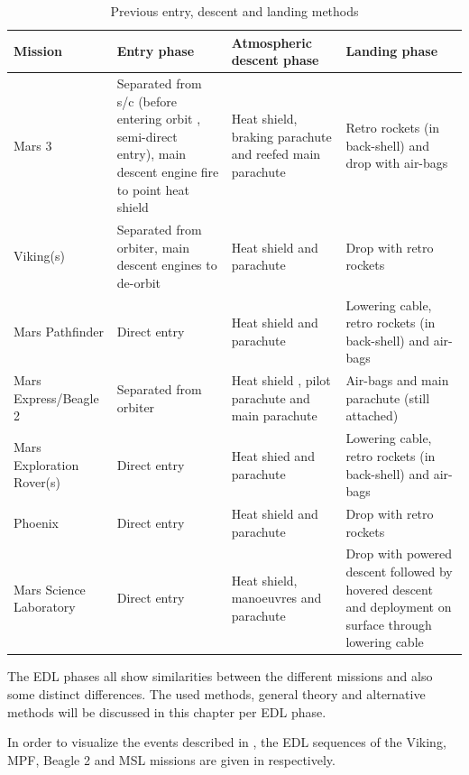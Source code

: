 \begin{longtable}{|l|p{4cm}|p{4cm}|p{4cm}|}
\caption{Previous entry, descent and landing methods}
\label{tab:overtechentdes}
\endfirsthead
\endhead
\hline 
\textbf{Mission} 		& \textbf{Entry phase} & \textbf{Atmospheric descent phase} & \textbf{Landing phase} \\ \hline \hline
Mars 3 		& Separated from \ac{s/c} (before entering orbit \cite{mars3_2014}, semi-direct entry), main descent engine fire to point heat shield & Heat shield, braking parachute and reefed main parachute \cite{macdonald2014} & Retro rockets (in back-shell) and drop with air-bags \cite{perminov1999} \\ \hline
Viking(s) 		& Separated from orbiter, main descent engines to de-orbit & Heat shield and parachute & Drop with retro rockets \\ \hline
Mars Pathfinder 		& Direct entry & Heat shield and parachute & Lowering cable, retro rockets (in back-shell) and air-bags  \\ \hline
Mars Express/Beagle 2 		& Separated from orbiter & Heat shield , pilot parachute and main parachute \cite{mooij2013para} & Air-bags and main parachute (still attached) \\ \hline
Mars Exploration Rover(s) 		& Direct entry & Heat shied and parachute & Lowering cable, retro rockets (in back-shell) and air-bags \\ \hline
Phoenix 		& Direct entry & Heat shield and parachute & Drop with retro rockets \\ \hline
Mars Science Laboratory 		& Direct entry & Heat shield, manoeuvres and parachute & Drop with powered descent followed by hovered descent and deployment on surface through lowering cable \\ \hline
	
\end{longtable}

The \ac{EDL} phases all show similarities between the different missions and also some distinct differences. The used methods, general theory and alternative methods will be discussed in this chapter per \ac{EDL} phase. 


In order to visualize the events described in , the \ac{EDL} sequences of the Viking, \ac{MPF}, Beagle 2 and \ac{MSL} missions are given in  respectively. 

